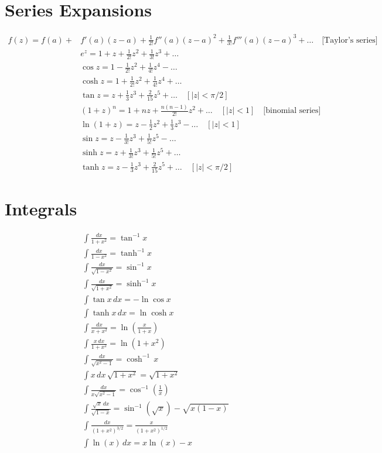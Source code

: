 \documentclass[a4paper,oneside,article]{memoir}
\begin{document}
\section{Series Expansions}
\begin{align*}
    f(z) = f(a) + & f'(a)(z - a) + \frac{1}{2!}f''(a)(z - a)^2 + \frac{1}{3!}f'''(a)(z - a)^3 + \dots \quad \text{[Taylor's series]} \\
    & e^z = 1 + z + \frac{1}{2!}z^2 + \frac{1}{3!}z^3 + \dots \\
    & \cos z = 1 - \frac{1}{2!}z^2 + \frac{1}{4!}z^4 - \dots \\
    & \cosh z = 1 + \frac{1}{2!}z^2 + \frac{1}{4!}z^4 + \dots \\
    & \tan z = z + \frac{1}{3}z^3 + \frac{2}{15}z^5 + \dots \quad [|z| < \pi/2] \\
    & (1 + z)^n = 1 + nz + \frac{n(n - 1)}{2!}z^2 + \dots \quad [|z| < 1] \quad \text{[binomial series]} \\
    & \ln(1 + z) = z - \frac{1}{2}z^2 + \frac{1}{3}z^3 - \dots \quad [|z| < 1] \\
    & \sin z = z - \frac{1}{3!}z^3 + \frac{1}{5!}z^5 - \dots \\
    & \sinh z = z + \frac{1}{3!}z^3 + \frac{1}{5!}z^5 + \dots \\
    & \tanh z = z - \frac{1}{3}z^3 + \frac{2}{15}z^5 + \dots \quad [|z| < \pi/2]
\end{align*}

\section{Integrals}
\begin{align*}
    & \int \frac{dx}{1 + x^2} = \tan^{-1} x \\
    & \int \frac{dx}{1 - x^2} = \tanh^{-1} x \\
    & \int \frac{dx}{\sqrt{1 - x^2}} = \sin^{-1} x \\
    & \int \frac{dx}{\sqrt{1 + x^2}} = \sinh^{-1} x \\
    & \int \tan x \, dx = - \ln \cos x \\
    & \int \tanh x \, dx = \ln \cosh x \\
    & \int \frac{dx}{x + x^2} = \ln \left( \frac{x}{1 + x} \right) \\
    & \int \frac{x \, dx}{1 + x^2} = \ln(1 + x^2) \\
    & \int \frac{dx}{\sqrt{x^2 - 1}} = \cosh^{-1} \, x \\
    & \int x \, dx \, \sqrt{1 + x^2} = \sqrt{1 + x^2} \\
    & \int \frac{dx}{x \sqrt{x^2 - 1}} = \cos^{-1}\left(\frac{1}{x}\right) \\
    & \int \frac{\sqrt{x} \, dx}{\sqrt{1 - x}} = \sin^{-1}(\sqrt{x}) - \sqrt{x(1 - x)} \\
    & \int \frac{dx}{(1 + x^2)^{3/2}} = \frac{x}{(1 + x^2)^{1/2}} \\
    & \int \ln(x) \, dx = x \ln(x) - x \\
\end{align*}
\end{document}
